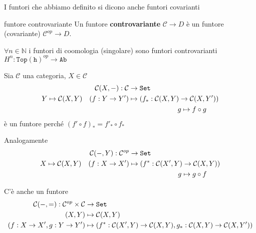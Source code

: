 \begin{note}{}
    I funtori che abbiamo definito si dicono anche funtori covarianti
\end{note}
\begin{definition}{funtore controvariante}
    Un funtore \textbf{controvariante} \(\mathcal{C} \to D\) è un funtore (covariante) \(\mathcal{C}^{op} \to D\).
\end{definition}
\begin{example}{}
    \(\forall n \in \mathbb{N}\) i funtori di coomologia (singolare) sono funtori
    controvarianti \(H^{n} : \mathtt{Top(h)}^{op} \to \mathtt{Ab}\) 
\end{example}
\begin{example}{}
    Sia \(\mathcal{C}\) una categoria, \(X \in \mathcal{C}\)
    \begin{align*}
        \mathcal{C}{(X, \--)} : \mathcal{C} &\to \mathtt{Set} \\
        Y \mapsto \mathcal{C}{(X, Y)} \quad {(f : Y \to Y')} &\mapsto {(f_{*} : \mathcal{C}{(X, Y)} \to \mathcal{C}{(X, Y')})} \\
            & \quad \quad \quad \quad\quad\quad\quad  g \mapsto f \circ g
    \end{align*}
    è un funtore perché \({(f' \circ f)}_* = f'_* \circ f_*\) 

    Analogamente 
    \begin{align*}
        \mathcal{C}{(\--, Y)} : \mathcal{C}^{op} &\to \mathtt{Set} \\
        X \mapsto \mathcal{C}{(X, Y)} \quad {(f : X \to X')} &\mapsto {(f^{*} : \mathcal{C}{(X', Y)} \to \mathcal{C}{(X, Y)})} \\
            & \quad \quad \quad \quad\quad\quad\quad  g \mapsto g \circ f
    \end{align*}
\end{example}
\begin{remark}{}
    C'è anche un funtore 
    \begin{align*}
        \mathcal{C}{(\--, =)} : \mathcal{C}^{op} \times \mathcal{C} &\to \mathtt{Set} \\
        {(X, Y)} &\mapsto \mathcal{C}{(X, Y)} \\
        {(f : X \to X', g : Y \to Y')} &\mapsto {(f^* : \mathcal{C}{(X', Y)} \to  \mathcal{C}{(X,Y)}, g_* : \mathcal{C}{(X, Y)} \to \mathcal{C}{(X, Y')})}
    \end{align*}
\end{remark}
